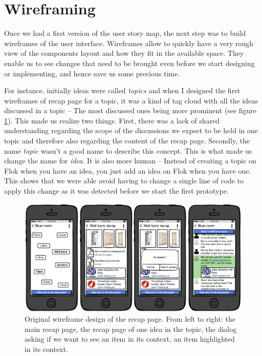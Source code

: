 \documentclass[a4paper,12pt, oneside]{article}
\begin{document}
\clearpage

\section{Wireframing}
Once we had a first version of the user story map, the next step was to build wireframes of the user interface.
Wireframes allow to quickly have a very rough view of the components layout and how they fit in the available space.
They enable us to see changes that need to be brought even before we start designing or implementing, and hence save us some precious time.

For instance, initially ideas were called \emph{topics} and when I designed the first wireframes of recap page for a topic, it was a kind of tag cloud with all the ideas discussed in a topic – The most discussed ones being more prominent (see figure \ref{fig.originalRecapWireframes}).
This made us realize two things.
First, there was a lack of shared understanding regarding the scope of the discussions we expect to be held in one topic and therefore also regarding the content of the recap page.
Secondly, the name \emph{topic} wasn't a good name to describe this concept.
This is what made us change the name for \emph{idea}. It is also more human – Instead of creating a topic on Flok when you have an idea, you just add an idea on Flok when you have one.
This shows that we were able avoid having to change a single line of code to apply this change as it was detected before we start the first prototype.

\begin{figure}[!htb]
\centering
\includegraphics[width=\textwidth]{images/originalRecapWireframes.png}
\caption{Original wireframe design of the recap page. From left to right: the main recap page, the recap page of one idea in the topic, the dialog asking if we want to see an item in its context, an item highlighted in its context.}
\label{fig.originalRecapWireframes}
\end{figure}
\end{document}
